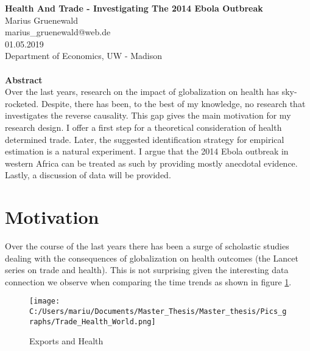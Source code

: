 \documentclass{article}
\begin{document}
\begin{titlepage}
\pagestyle{empty}
\Large
\begin{center}
\vspace*{2.5 cm} \LARGE
\textbf{Health And Trade - Investigating The 2014 Ebola Outbreak}\\
\Large \vspace*{2.5 cm}
Marius Gruenewald\\\vspace{0.375 cm}
marius{\_}gruenewald@web.de \\\vspace{0.375 cm}
01.05.2019 \\ \vspace{0.375 cm}
Department of Economics, UW - Madison \\ 
\textbf{}\\
\textbf{Abstract}\\
{\normalsize Over the last years, research on the impact of globalization on health has sky-rocketed. Despite, there has been, to the best of my knowledge, no research that investigates the reverse causality. This gap gives the main motivation for my research design. I offer a first step for a theoretical consideration of health determined trade. Later, the suggested identification strategy for empirical estimation is a natural experiment. I argue that the 2014 Ebola outbreak in western Africa can be treated as such by providing mostly anecdotal evidence. Lastly, a discussion of data will be provided.}
\end{center}
\vspace{2.5 cm}
\end{titlepage}

\pagebreak
\pagestyle{plain}
\newpage
\setcounter{page}{2}
\setlength{\baselineskip}{1\baselineskip}
\pagestyle{plain}

\section{Motivation}

Over the course of the last years there has been a surge of scholastic studies dealing with the consequences of globalization on health outcomes (the Lancet series on trade and health). This is not surprising given the interesting data connection we observe when comparing the time trends as shown in figure \ref{Exports and Health}.

\begin{figure}[!ht]
\begin{center}\caption{Exports and Health \label{Exports and Health}}
\texttt{[image: C:/Users/mariu/Documents/Master\_Thesis/Master\_thesis/Pics\_graphs/Trade\_Health\_World.png]}\\
\end{center}
\end{figure}
\end{document}
